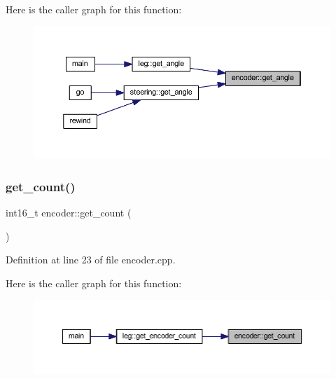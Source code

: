 Here is the caller graph for this function\+:
\nopagebreak
\begin{figure}[H]
\begin{center}
\leavevmode
\includegraphics[width=350pt]{classencoder_aba5b6ccdb374d7fcc5d9f2abab1a59da_icgraph}
\end{center}
\end{figure}
\mbox{\label{classencoder_a51dc12e785ffd79f4c87e3533ae30434}} 
\subsubsection{\texorpdfstring{get\_count()}{get\_count()}}
{\footnotesize\ttfamily int16\+\_\+t encoder\+::get\+\_\+count (\begin{DoxyParamCaption}{ }\end{DoxyParamCaption})}



Definition at line 23 of file encoder.\+cpp.

Here is the caller graph for this function\+:
\nopagebreak
\begin{figure}[H]
\begin{center}
\leavevmode
\includegraphics[width=350pt]{classencoder_a51dc12e785ffd79f4c87e3533ae30434_icgraph}
\end{center}
\end{figure}
\mbox{\label{classencoder_a9be6cc4f517fdc88970eb5d39e52f5c8}} 

